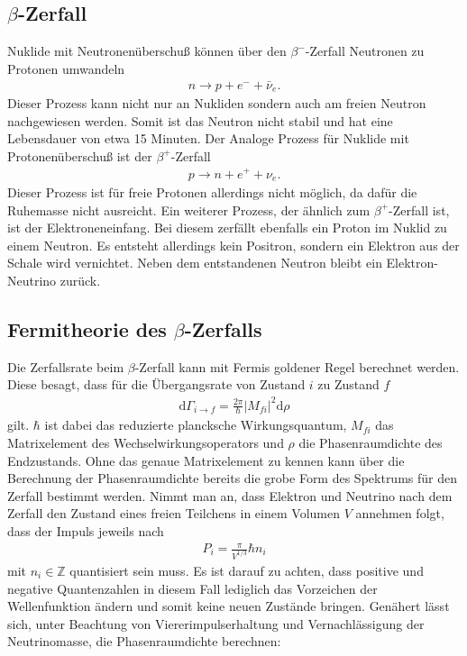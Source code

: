 \subsection{$\beta$-Zerfall}
Nuklide mit Neutronenüberschuß können über den $\beta^-$-Zerfall Neutronen zu Protonen umwandeln
\begin{align*}
  n \rightarrow p + e^- + \bar{\nu}_e.
\end{align*}
Dieser Prozess kann nicht nur an Nukliden sondern auch am freien Neutron nachgewiesen werden. Somit ist das Neutron nicht stabil und hat eine Lebensdauer von etwa 15 Minuten\cite{Agashe:2014kda}.
Der Analoge Prozess für Nuklide mit Protonenüberschuß ist der $\beta^+$-Zerfall
\begin{align*}
  p \rightarrow n + e^+ + \nu_e.
\end{align*}
Dieser Prozess ist für freie Protonen allerdings nicht möglich, da dafür die Ruhemasse nicht ausreicht. 
Ein weiterer Prozess, der ähnlich zum $\beta^+$-Zerfall ist, ist der Elektroneneinfang. Bei diesem zerfällt ebenfalls ein Proton im Nuklid zu einem Neutron. Es entsteht allerdings kein Positron, sondern ein Elektron aus der Schale wird vernichtet. Neben dem entstandenen Neutron bleibt ein Elektron-Neutrino zurück.

\subsection{Fermitheorie des $\beta$-Zerfalls}    
Die Zerfallsrate beim $\beta$-Zerfall kann mit Fermis goldener Regel berechnet werden. Diese besagt, dass für die Übergangsrate von Zustand $i$ zu Zustand $f$
\begin{align*}
  \mathrm{d}\Gamma_{i \rightarrow f}=\frac{2\pi}{\hbar}| M_{fi} |^2 \mathrm{d} \rho
\end{align*}
gilt\cite{Zhang:2016nxa}. $\hbar$ ist dabei das reduzierte plancksche Wirkungsquantum, $M_{fi}$ das Matrixelement des Wechselwirkungsoperators und $\rho$ die Phasenraumdichte des Endzustands. Ohne das genaue Matrixelement zu kennen kann über die Berechnung der Phasenraumdichte bereits die grobe Form des Spektrums für den Zerfall bestimmt werden. Nimmt man an, dass Elektron und Neutrino nach dem Zerfall den Zustand eines freien Teilchens in einem Volumen $V$ annehmen folgt, dass der Impuls jeweils nach 
\begin{align*}
  P_i=\frac{\pi}{V^{1/3}}\hbar n_i
\end{align*}
mit $n_i \in \mathbb{Z}$ quantisiert sein muss. Es ist darauf zu achten, dass positive und negative Quantenzahlen in diesem Fall lediglich das Vorzeichen der Wellenfunktion ändern und somit keine neuen Zustände bringen. Genähert lässt sich, unter Beachtung von Viererimpulserhaltung und Vernachlässigung der Neutrinomasse, die Phasenraumdichte berechnen:

